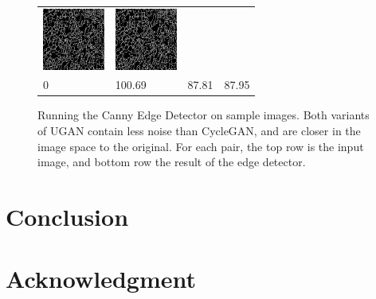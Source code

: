 \documentclass[conference]{IEEEtran}
\begin{document}
\begin{figure}
\begin{tabular}{p{1.7cm} p{1.7cm} p{1.7cm} p{1.5cm}}
   \includegraphics[width=0.8in]{n02607072_4739_u0edges} &
   \includegraphics[width=0.8in]{n02607072_4739_u1edges} \\
   0 & \small{100.69} & \small{87.81} & \small{87.95} \\
   
\end{tabular}
\caption{Running the Canny Edge Detector on sample images. Both variants of UGAN contain less noise than CycleGAN,
and are closer in the image space to the original. For each pair, the top row is the input image, and bottom row
the result of the edge detector.}
\end{figure}


\section{Conclusion}



\section*{Acknowledgment}

%
%


\end{document}
